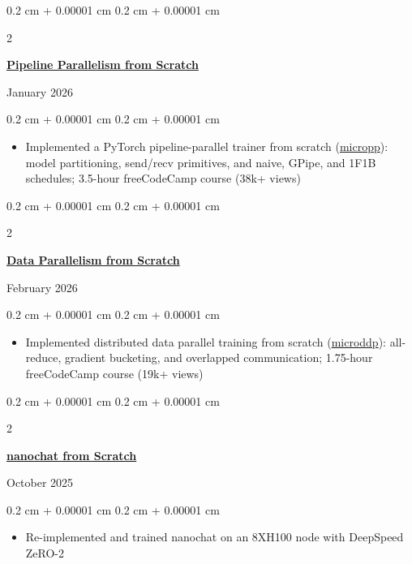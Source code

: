 \documentclass[10pt, letterpaper]{article}
\newenvironment{highlights}{
    \begin{itemize}[
        topsep=0.09 cm,
        parsep=0.09 cm,
        partopsep=0pt,
        itemsep=0pt,
        leftmargin=0.4 cm + 10pt
    ]
}{
    \end{itemize}
}
\newenvironment{onecolentry}{
    \begin{adjustwidth}{
        0.2 cm + 0.00001 cm
    }{
        0.2 cm + 0.00001 cm
    }
}{
    \end{adjustwidth}
}
\newenvironment{twocolentry}[2][]{
    \begin{adjustwidth}{
        0.2 cm + 0.00001 cm
    }{
        0.2 cm + 0.00001 cm
    }
    \def\secondColumn{#2}
    \setcolumnwidth{\fill, 5.2 cm}
    \begin{paracol}{2}
}{
    \switchcolumn \raggedleft \secondColumn
    \end{paracol}
    \end{adjustwidth}
}
\let\hrefWithoutArrow\href
\renewcommand{\href}[2]{\hrefWithoutArrow{#1}{#2}}
\begin{document}
        \vspace{0.09 cm}

        \begin{twocolentry}{January 2026}
            \textbf{\href{https://www.youtube.com/watch?v=D5F8kp_azzw}{Pipeline Parallelism from Scratch}}
        \end{twocolentry}

        \vspace{0.09 cm}
        \begin{onecolentry}
            \begin{highlights}
                \item Implemented a PyTorch pipeline-parallel trainer from scratch (\href{https://github.com/kiankyars/micropp}{micropp}): model partitioning, send/recv primitives, and naive, GPipe, and 1F1B schedules; 3.5-hour freeCodeCamp course (38k+ views)
            \end{highlights}
        \end{onecolentry}

        \vspace{0.09 cm}

        \begin{twocolentry}{February 2026}
            \textbf{\href{https://www.youtube.com/watch?v=7q4D6_3syuE}{Data Parallelism from Scratch}}
        \end{twocolentry}

        \vspace{0.09 cm}
        \begin{onecolentry}
            \begin{highlights}
                \item Implemented distributed data parallel training from scratch (\href{https://github.com/kiankyars/microddp}{microddp}): all-reduce, gradient bucketing, and overlapped communication; 1.75-hour freeCodeCamp course (19k+ views)
            \end{highlights}
        \end{onecolentry}

        \vspace{0.09 cm}

        \begin{twocolentry}{October 2025}
            \textbf{\href{https://github.com/kiankyars/DeepLearning}{nanochat from Scratch}}
        \end{twocolentry}

        \vspace{0.09 cm}
        \begin{onecolentry}
            \begin{highlights}
                \item Re-implemented and trained nanochat on an 8XH100 node with DeepSpeed ZeRO-2
            \end{highlights}
        \end{onecolentry}
\end{document}
